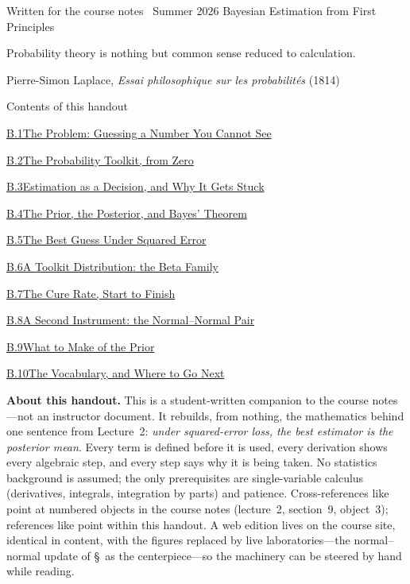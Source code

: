 \documentclass[main.tex]{subfiles}
\begin{document}
%
  {Written for the course notes \textperiodcentered\ Summer 2026}%
  {Bayesian Estimation from First Principles}

\epigraph{Probability theory is nothing but common sense reduced to calculation.}%
{Pierre-Simon Laplace, \emph{Essai philosophique sur les probabilit\'es} (1814)}

\begin{lecturecontents}{Contents of this handout}
  \item \hyperlink{B.1}{B.1\quad The Problem: Guessing a Number You Cannot See}
  \item \hyperlink{B.2}{B.2\quad The Probability Toolkit, from Zero}
  \item \hyperlink{B.3}{B.3\quad Estimation as a Decision, and Why It Gets Stuck}
  \item \hyperlink{B.4}{B.4\quad The Prior, the Posterior, and Bayes' Theorem}
  \item \hyperlink{B.5}{B.5\quad The Best Guess Under Squared Error}
  \item \hyperlink{B.6}{B.6\quad A Toolkit Distribution: the Beta Family}
  \item \hyperlink{B.7}{B.7\quad The Cure Rate, Start to Finish}
  \item \hyperlink{B.8}{B.8\quad A Second Instrument: the Normal--Normal Pair}
  \item \hyperlink{B.9}{B.9\quad What to Make of the Prior}
  \item \hyperlink{B.10}{B.10\quad The Vocabulary, and Where to Go Next}
\end{lecturecontents}

\bigskip
\noindent\textbf{About this handout.} This is a student-written companion to the course
notes---not an instructor document. It rebuilds, from nothing, the mathematics behind one
sentence from Lecture~2: \emph{under squared-error loss, the best estimator is the posterior
mean}. Every term is defined before it is used, every derivation shows every algebraic step,
and every step says why it is being taken. No statistics background is assumed; the only
prerequisites are single-variable calculus (derivatives, integrals, integration by parts) and
patience. Cross-references like  point at numbered objects in the course notes
(lecture~2, section~9, object~3); references like  point within this handout.
A web edition lives on the course site, identical in content, with the figures replaced by
live laboratories---the normal--normal update of \S\, as the centerpiece---so the
machinery can be steered by hand while reading.
\end{document}
